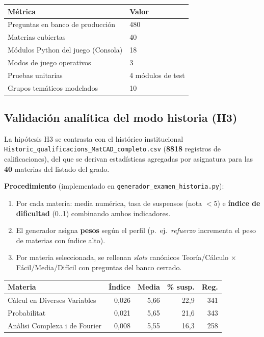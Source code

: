 \documentclass[11pt,a4paper]{article}
\newcommand{\iniciotabla}{\par\medskip\renewcommand{\arraystretch}{1.12}}
\newcommand{\fintabla}{\par\medskip}
\begin{document}
\begin{tabular}{@{}ll@{}}
\toprule
\textbf{Métrica} & \textbf{Valor} \\
\midrule
Preguntas en banco de producción & 480 \\
Materias cubiertas & 40 \\
Módulos Python del juego (Consola) & 18 \\
Modos de juego operativos & 3 \\
Pruebas unitarias & 4 módulos de test \\
Grupos temáticos modelados & 10 \\
\bottomrule
\end{tabular}

\subsection{Validación analítica del modo historia (H3)}

La hipótesis H3 se contrasta con el histórico institucional \texttt{Historic\_qualificacions\_MatCAD\_completo.csv} (\textbf{8818} registros de calificaciones), del que se derivan estadísticas agregadas por asignatura para las \textbf{40} materias del listado del grado.

\textbf{Procedimiento} (implementado en \texttt{generador\_examen\_historia.py}):
\begin{enumerate}
  \item Por cada materia: media numérica, tasa de suspensos (nota $< 5$) e \textbf{índice de dificultad} (0..1) combinando ambos indicadores.
  \item El generador asigna \textbf{pesos} según el perfil (p.\ ej.\ \textit{refuerzo} incrementa el peso de materias con índice alto).
  \item Por materia seleccionada, se rellenan \textit{slots} canónicos Teoría/Cálculo $\times$ Fácil/Media/Difícil con preguntas del banco cerrado.
\end{enumerate}

\iniciotabla
\begin{tabular}{@{}lrrrr@{}}
\toprule
\textbf{Materia} & \textbf{Índice} & \textbf{Media} & \textbf{\% susp.} & \textbf{Reg.} \\
\midrule
Càlcul en Diverses Variables & 0,026 & 5,66 & 22,9 & 341 \\
Probabilitat & 0,021 & 5,65 & 21,6 & 343 \\
Anàlisi Complexa i de Fourier & 0,008 & 5,55 & 16,3 & 258 \\
\bottomrule
\end{tabular}
\label{tab:h4-dificultad}
\fintabla
\end{document}

